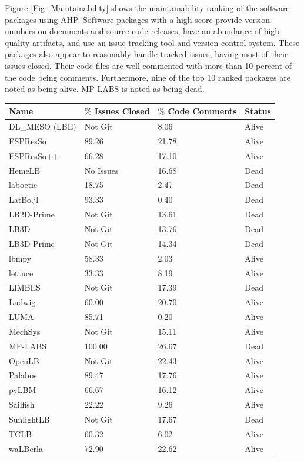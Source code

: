 \documentclass[12pt, notitlepage]{article}
\begin{document}
Figure \ref{Fig_Maintainability} shows the maintainability ranking of the software packages using AHP. Software packages with a high score provide version numbers on documents and source code releases, have an abundance of high quality artifacts, and use an issue tracking tool and version control system. These packages also appear to reasonably handle tracked issues, having most of their issues closed. Their code files are well commented with more than 10 percent of the code being comments. Furthermore, nine of the top 10 ranked packages are noted as being alive. MP-LABS is noted as being dead.\\

\begin{onehalfspacing}
\begin{center}
	\begin{tabular}{ p{3.5cm}p{3.5cm}p{3.5cm}p{2.5cm} }
		\hline
		Name & $\%$ Issues Closed & $\%$ Code Comments& Status\\
		\hline
		DL\_MESO (LBE) & Not Git & 8.06&Alive\\
		ESPResSo & 89.26 & 21.78&Alive\\
		ESPResSo++ & 66.28 & 17.10&Alive\\
		HemeLB & No Issues & 16.68&Dead\\
		laboetie & 18.75 & 2.47&Dead\\		
		LatBo.jl & 93.33 & 0.40&Dead\\
		LB2D-Prime & Not Git & 13.61&Dead\\
		LB3D & Not Git & 13.76&Dead\\
		LB3D-Prime & Not Git & 14.34&Dead\\
		lbmpy& 58.33  & 2.03  &Alive\\
		lettuce & 33.33 & 8.19&Alive\\
		LIMBES & Not Git & 17.39&Dead\\
		Ludwig& 60.00 & 20.70&Alive\\
		LUMA& 85.71   & 0.20&Alive\\
		MechSys & Not Git & 15.11&Alive\\
		MP-LABS & 100.00 & 26.67&Dead\\
		OpenLB & Not Git & 22.43&Alive\\
		Palabos & 89.47 & 17.76&Alive\\
		pyLBM & 66.67& 16.12&Alive\\
		Sailfish & 22.22 & 9.26&Alive\\
		SunlightLB & Not Git & 17.67&Dead\\
		TCLB & 60.32 & 6.02&Alive\\
		waLBerla & 72.90 & 22.62&Alive\\
		\hline
	\end{tabular}
	\label{gitrepodata}
\end{center}
\end{onehalfspacing}
\end{document}
